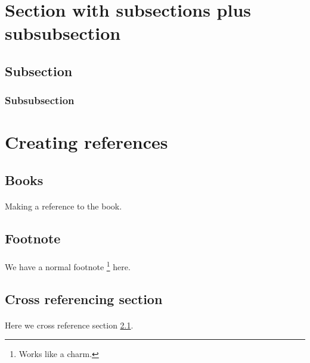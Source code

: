 \documentclass[a4paper,12pt]{article}
\begin{document}
\section{Section with subsections plus subsubsection}
    \subsection{Subsection}
        \paragraph*{} \lipsum[1]
        \subsubsection{Subsubsection}
            \paragraph*{} \lipsum[5]

\section{Creating references}
    \subsection{Books} \label{books}
        \paragraph*{} Making a reference to the book\cite{book01}.

    \subsection{Footnote}
        \paragraph*{} We have a normal footnote \footnote{Works like a charm.} here.

    \subsection{Cross referencing section}
        \paragraph*{} Here we cross reference section \ref{books}.
\end{document}
